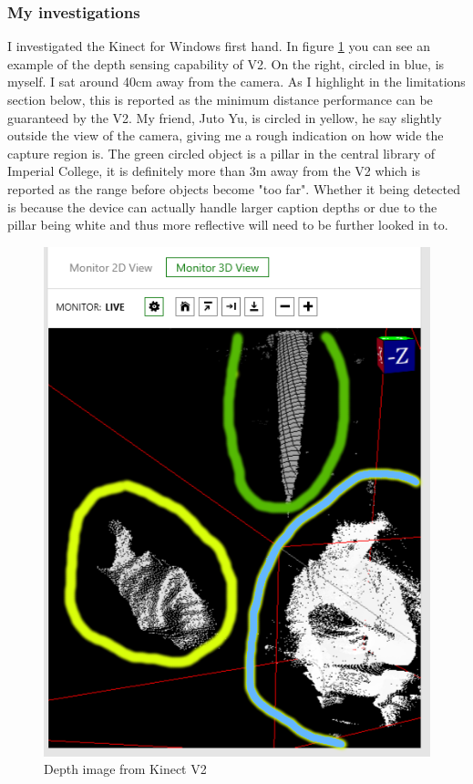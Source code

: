 \documentclass[11pt]{article}
\begin{document}
\subsubsection{My investigations} 
I investigated the Kinect for Windows first hand. In figure \ref{KinectDepth} 
you can see an example of the depth sensing capability of V2. On the right,
circled in blue, is myself. I sat around 40cm away from the camera. As I highlight 
in the limitations section below, this is reported as the minimum distance 
performance can be guaranteed by the V2. My friend, Juto Yu, is circled in 
yellow, he say slightly outside the view of the camera, giving me a rough 
indication on how wide the capture region is. The green circled object is a 
pillar in the central library of Imperial College, it is definitely more than 
3m away from the V2 which is reported as the range before objects become 
"too far". Whether it being detected is because the device can actually 
handle larger caption depths or due to the pillar being white and thus 
more reflective will need to be further looked in to.
\begin{center}
	\begin{figure}[H]
		\begin{center}
			\includegraphics[scale=0.5]{pics/KinectDepth}
				\caption{Depth image from Kinect V2}
				\label{KinectDepth}
		\end{center}
	\end{figure}
\end{center}
\end{document}
